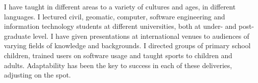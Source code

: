 \begin{minipage}{0.50\textwidth}
I have taught in different areas to a variety of cultures and ages, in
different languages. I lectured civil, geomatic, computer, software
engineering and information technology students at different universities,
both at under- and post-graduate level.  I have given presentations at
international venues to audiences of varying fields of knowledge and
backgrounds.  I directed groups of primary school children, trained users
on software usage and taught sports to children and adults.  Adaptability
has been the key to success in each of these deliveries, adjusting on the
spot.

%


\end{minipage}



